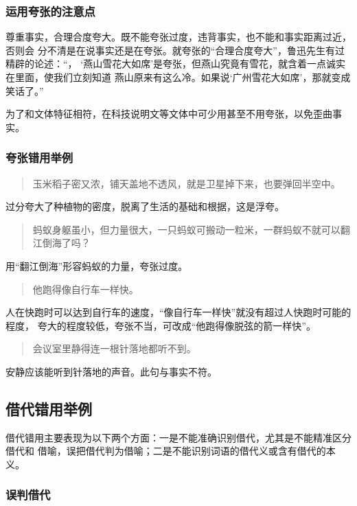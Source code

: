\documentclass[final,oneside]{ctexbook}
\newenvironment{equotation}{\begin{quotation}\kaishu}{\end{quotation}}
\begin{document}
\subsubsection{运用夸张的注意点}

尊重事实，合理合度夸大。既不能夸张过度，违背事实，也不能和事实距离过近，否则会
分不清是在说事实还是在夸张。就夸张的“合理合度夸大”，鲁迅先生有过精辟的论述：“，
‘燕山雪花大如席’是夸张，但燕山究竟有雪花，就含着一点诚实在里面，使我们立刻知道
燕山原来有这么冷。如果说‘广州雪花大如席’，那就变成笑话了。”

为了和文体特征相符，在科技说明文等文体中可少用甚至不用夸张，以免歪曲事实。

\subsubsection{夸张错用举例}

\begin{equotation}
  玉米稻子密又浓，铺天盖地不透风，就是卫星掉下来，也要弹回半空中。
\end{equotation}
过分夸大了种植物的密度，脱离了生活的基础和根据，这是浮夸。

\begin{equotation}
  蚂蚁身躯虽小，但力量很大，一只蚂蚁可搬动一粒米，一群蚂蚁不就可以翻江倒海了吗？
\end{equotation}
用“翻江倒海”形容蚂蚁的力量，夸张过度。

\begin{equotation}
  他跑得像自行车一样快。
\end{equotation}
人在快跑时可以达到自行车的速度，“像自行车一样快”就没有超过人快跑时可能的程度，
夸大的程度较低，夸张不当，可改成“他跑得像脱弦的箭一样快”。

\begin{equotation}
  会议室里静得连一根针落地都听不到。
\end{equotation}
安静应该能听到针落地的声音。此句与事实不符。

\subsection{借代错用举例}

借代错用主要表现为以下两个方面：一是不能准确识别借代，尤其是不能精准区分借代和
借喻，误把借代判为借喻；二是不能识别词语的借代义或含有借代的本义。

\subsubsection{误判借代}
\end{document}
